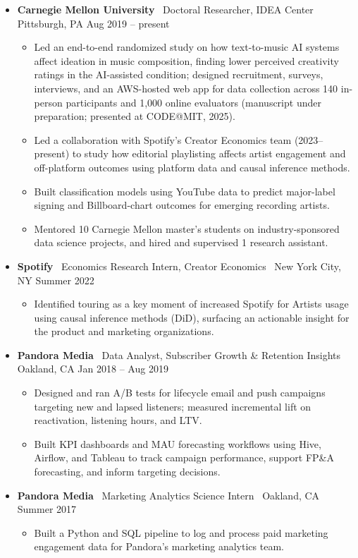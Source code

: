 \documentclass[10pt,letterpaper]{article}
\newcommand{\sep}{{\color{gray}\,\textbullet\,\,}}
\begin{document}
\begin{itemize}[leftmargin=0pt, label={}, itemsep=4pt]
\item \textbf{Carnegie Mellon University} \sep Doctoral Researcher, IDEA Center \sep Pittsburgh, PA \hfill Aug 2019 -- present
  \begin{itemize}
  \item Led an end-to-end randomized study on how text-to-music AI systems affect ideation in music composition, finding lower perceived creativity ratings in the AI-assisted condition; designed recruitment, surveys, interviews, and an AWS-hosted web app for data collection across 140 in-person participants and 1{,}000 online evaluators (manuscript under preparation; presented at CODE@MIT, 2025).
  \item Led a collaboration with Spotify's Creator Economics team (2023--present) to study how editorial playlisting affects artist engagement and off-platform outcomes using platform data and causal inference methods.
  \item Built classification models using YouTube data to predict major-label signing and Billboard-chart outcomes for emerging recording artists.
  \item Mentored 10 Carnegie Mellon master's students on industry-sponsored data science projects, and hired and supervised 1 research assistant.
  \end{itemize}
\item \textbf{Spotify} \sep Economics Research Intern, Creator Economics \sep New York City, NY \hfill Summer 2022
  \begin{itemize}
  \item Identified touring as a key moment of increased Spotify for Artists usage using causal inference methods (DiD), surfacing an actionable insight for the product and marketing organizations.
  \end{itemize}
\item \textbf{Pandora Media} \sep Data Analyst, Subscriber Growth \& Retention Insights \sep Oakland, CA \hfill Jan 2018 -- Aug 2019
  \begin{itemize}
  \item Designed and ran A/B tests for lifecycle email and push campaigns targeting new and lapsed listeners; measured incremental lift on reactivation, listening hours, and LTV.
  \item Built KPI dashboards and MAU forecasting workflows using Hive, Airflow, and Tableau to track campaign performance, support FP\&A forecasting, and inform targeting decisions.
  \end{itemize}
\item \textbf{Pandora Media} \sep Marketing Analytics Science Intern \sep Oakland, CA \hfill Summer 2017
  \begin{itemize}
  \item Built a Python and SQL pipeline to log and process paid marketing engagement data for Pandora's marketing analytics team.
  \end{itemize}
\end{itemize}
\end{document}
